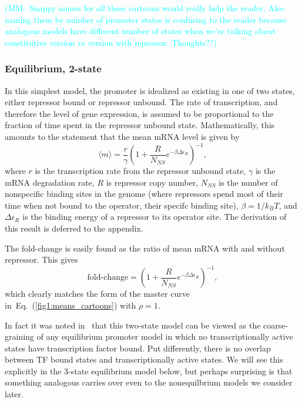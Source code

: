 \documentclass[12pt]{article}%
\newcommand{\mmnote}[1]{\textcolor{cyan}{(MM:~#1)}}
\newcommand{\eq}[1]{Eq.~(\ref{#1})}
\begin{document}
\mmnote{Snappy names for all these cartoons would really help the reader. Also naming them by number of promoter states is confusing to the reader because analogous models have different number of states when we're talking about constitutive version vs version with repressor. Thoughts??}

\subsubsection{Equilibrium, 2-state}
In this simplest model, the promoter is idealized as existing in
one of two states, either repressor bound or repressor unbound.
The rate of transcription, and therefore the level of gene
expression, is assumed to be proportional to the fraction of time
spent in the repressor unbound state.
Mathematically, this amounts to the statement that the mean mRNA level is
given by
\begin{equation}
\langle m \rangle = \frac{r}{\gamma}
        \left(1 + \frac{R}{N_{NS}} e^{-\beta\Delta\epsilon_R}\right)^{-1},
\end{equation}
where $r$ is the transcription rate from the repressor unbound
state, $\gamma$ is the mRNA degradation rate, $R$ is repressor
copy number, $N_{NS}$ is the number of nonspecific binding sites
in the genome (where repressors spend most of their time when not
bound to the operator, their specifc binding site),
$\beta=1/k_BT$, and $\Delta\epsilon_R$ is the binding energy of a
repressor to its operator site. The derivation of this result is deferred
to the appendix.

The fold-change is easily found as the ratio of mean mRNA with
and without repressor. This gives
\begin{equation}
\text{fold-change}
= \left(1 + \frac{R}{N_{NS}} e^{-\beta\Delta\epsilon_R}\right)^{-1},
\end{equation}
which clearly matches the form of the master curve
in~\eq{fig1:means_cartoons} with $\rho=1$.

In fact it was noted in~\cite{Chure2019} that this two-state
model can be viewed as the coarse-graining of any equilibrium
promoter model in which no transcriptionally active states have
transcription factor bound. Put differently, there is no overlap
between TF bound states and transcriptionally active states. We
will see this explicitly in the 3-state equilibrium model below,
but perhaps surprising is that something analogous carries over
even to the nonequilbrium models we consider later.
\end{document}
